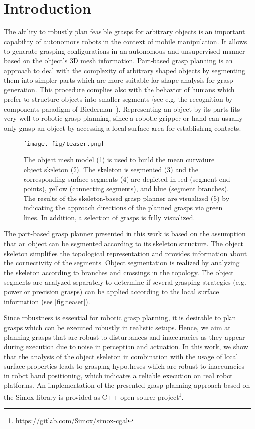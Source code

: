\section{Introduction}

The ability to robustly plan feasible grasps for arbitrary objects is an important capability of autonomous robots in the context of mobile manipulation. It allows to generate grasping configurations in an autonomous and unsupervised manner based on the object's 3D mesh information.
Part-based grasp planning is an approach to deal with the complexity of arbitrary shaped objects by segmenting them into simpler parts which are more suitable for shape analysis for grasp generation. This procedure complies also with the behavior of humans which prefer to structure objects into smaller segments (see e.g. the recognition-by-components paradigm of Biederman~\cite{biederman1987}).
Representing an object by its parts fits very well to robotic grasp planning, since a robotic gripper or hand can usually only grasp an object by accessing a local surface area for establishing contacts.
\begin{figure}[t]%
\centering
\texttt{[image: fig/teaser.png]}%
\caption{The object mesh model (1) is used to build the mean curvature object skeleton (2). The skeleton is segmented (3) and the corresponding surface segments (4) are depicted in red (segment end points), yellow (connecting segments), and blue (segment branches).
The results of the skeleton-based grasp planner are visualized (5) by indicating the approach directions of the planned grasps via green lines. In addition, a selection of grasps is fully visualized.}
\label{fig:teaser}%
\end{figure}
The part-based grasp planner presented in this work is based on the assumption that an object can be segmented according to its skeleton structure. The object skeleton simplifies the topological representation and provides information about the connectivity of the segments.
Object segmentation is realized by analyzing the skeleton according to branches and crossings in the topology. 
The object segments are analyzed separately to determine if several grasping strategies (e.g. power or precision grasps) can be applied according to the local surface information (see \autoref{fig:teaser}).

Since robustness is essential for robotic grasp planning, it is desirable to plan grasps which can be executed robustly in realistic setups. Hence, we aim at planning grasps that are robust to disturbances and inaccuracies as they appear during execution due to noise in perception and actuation. In this work, we show that the analysis of the object skeleton in combination with the usage of local surface properties leads to grasping hypotheses which are robust to inaccuracies in robot hand positioning, which indicates a reliable execution on real robot platforms. An implementation of the presented grasp planning approach based on the Simox library \cite{Vahrenkamp12b} is provided as C++ open source project\footnote{https://gitlab.com/Simox/simox-cgal}. 


